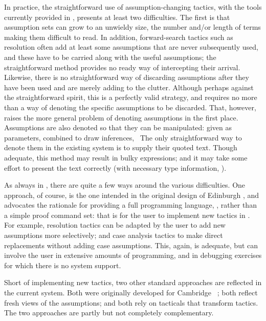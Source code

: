 In practice, the straightforward use of assumption-changing
tactics,
with the tools currently provided in \HOL, presents at
least two difficulties.  The first is that assumption sets can grow to an
unwieldy size, the number and/or length of terms making them difficult to
read.  In addition, forward-search tactics such as resolution often add at least
some assumptions that are never subsequently used, and these have to be
carried along with the useful assumptions; the straightforward
method provides no ready way of intercepting their arrival.
Likewise, there is no straightforward way of discarding
assumptions after they have been used and are merely adding to the clutter.
Although perhaps against the straightforward spirit, this is a perfectly valid
strategy, and
requires no more than a way of denoting
the specific assumptions to be discarded. That, however,
raises the more general problem of denoting assumptions in the first place.
Assumptions are also denoted
so that they can be
manipulated: given as parameters, combined to draw inferences, \etc\  The only
straightforward way to denote them in the existing system is to supply
their quoted text.  Though adequate, this
method may result in bulky \ML{} expressions; and it may take some effort to present the text
correctly (with necessary type information, \etc).

As always in \HOL, there are quite a few ways around the various difficulties.
One approach, of course, is the one intended in the original
design of Edinburgh \LCF,
and advocates the rationale for providing a full programming language, \ML,
rather than a simple proof command set: that is for the user to
implement new tactics in \ML.  For example, resolution tactics can be adapted
by the user to add new assumptions more selectively; and case analysis tactics
to make direct replacements without adding case assumptions.
This, again, is adequate, but can involve the user in extensive amounts of
programming, and in debugging exercises for which there is no
system support.

Short of implementing new tactics, two other standard
approaches are reflected in the current system.  Both were originally
developed for Cambridge \LCF\ \cite{lcp_rewrite,new-LCF-man}; both reflect
fresh views of the assumptions; and both rely on tacticals that transform
tactics.  The two approaches are
partly but not completely complementary.

